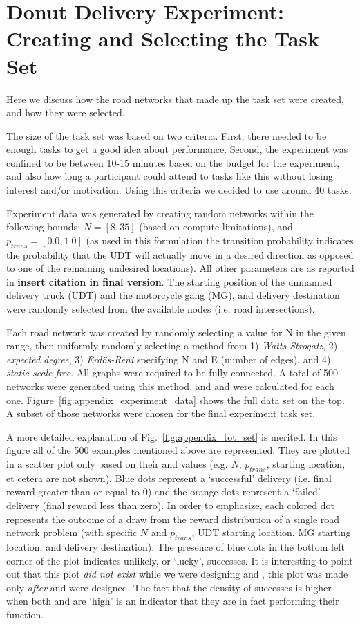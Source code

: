 \section{Donut Delivery Experiment: Creating and Selecting the Task Set} \label{sec:task_set}
Here we discuss how the road networks that made up the task set were created, and how they were selected.

The size of the task set was based on two criteria. First, there needed to be enough tasks to get a good idea about performance. Second, the experiment was confined to be between 10-15 minutes based on the budget for the experiment, and also how long a participant could attend to tasks like this without losing interest and/or motivation. Using this criteria we decided to use around 40 tasks.

Experiment data was generated by creating random networks within the following bounds: $N = [8,35]$ (based on compute limitations), and $p_{trans}=[0.0,1.0]$ (as used in this formulation the transition probability indicates the probability that the UDT will actually move in a desired direction as opposed to one of the remaining undesired locations). All other parameters are as reported in \textbf{insert citation in final version}. The starting position of the unmanned delivery truck (UDT) and the motorcycle gang (MG), and delivery destination were randomly selected from the available nodes (i.e. road intersections).

Each road network was created by randomly selecting a value for N in the given range, then uniformly randomly selecting a method from 1) \emph{Watts-Strogatz}, 2) \emph{expected degree}, 3) \emph{Erd\"{o}s-R\`{e}ni} specifying N and E (number of edges), and 4) \emph{static scale free}. All graphs were required to be fully connected. A total of 500 networks were generated using this method, and \xQ{} and \xO{} were calculated for each one. Figure~\ref{fig:appendix_experiment_data} shows the full data set on the top. A subset of those networks were chosen for the final experiment task set.

A more detailed explanation of Fig.~\ref{fig:appendix_tot_set} is merited. In this figure all of the 500 examples mentioned above are represented. They are plotted in a scatter plot only based on their \xQ{} and \xO{} values (e.g. $N$, $p_{trans}$, starting location, et cetera are not shown). Blue dots represent a `successful' delivery (i.e. final reward greater than or equal to 0) and the orange dots represent a `failed' delivery (final reward less than zero). In order to emphasize, each colored dot represents the outcome of a draw from the reward distribution of a single road network problem (with specific $N$ and $p_{trans}$, UDT starting location, MG starting location, and delivery destination). The presence of blue dots in the bottom left corner of the plot indicates unlikely, or `lucky', successes. It is interesting to point out that this plot \emph{did not exist} while we were designing \xQ{} and \xO{}, this plot was made only \emph{after} \xQ{} and \xO{} were designed. The fact that the density of successes is higher when both \xQ{} and \xO{} are `high' is an indicator that they are in fact performing their function.

